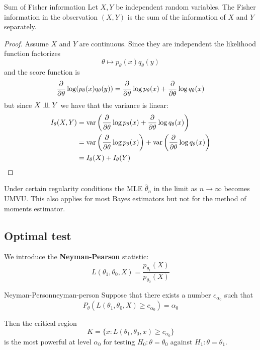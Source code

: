 \documentclass[12pt]{extarticle}
\renewcommand{\var}{{\operatorfont var}}
\begin{document}
\begin{lemma}{Sum of Fisher information}{}
    Let $X, Y$ be independent random variables.
    The Fisher information in the observation $(X, Y)$ is the sum of the information of $X$ and $Y$ separately.
\end{lemma}

\begin{proof}
    Assume $X$ and $Y$ are continuous.
    Since they are independent the likelihood function factorizes
    \begin{equation}
        \theta \mapsto p_\theta(x)q_\theta(y)
    \end{equation}
    and the score function is
    \begin{equation}
        \pdv{\theta} \log(p_\theta(x)q_\theta(y)) = \pdv{\theta} \log p_\theta(x) + \pdv{\theta} \log q_\theta(x)
    \end{equation}
    but since $X \perp \!\!\! \perp Y$ we have that the variance is linear:
    \begin{align}
        I_\theta(X, Y) & = \var \left(\pdv{\theta} \log p_\theta(x) + \pdv{\theta} \log q_\theta(x)\right)                   \\
                       & = \var \left(\pdv{\theta} \log p_\theta(x)\right) + \var \left(\pdv{\theta} \log q_\theta(x)\right) \\
                       & = I_\theta(X) + I_\theta(Y)
    \end{align}
\end{proof}

Under certain regularity conditions the MLE $\hat \theta_n$ in the limit as $n \to \infty$ becomes UMVU.
This also applies for most Bayes estimators but not for the method of moments estimator.

\subsection{Optimal test}

We introduce the \textbf{Neyman-Pearson} statistic:
\begin{equation}
    L(\theta_1, \theta_0, X) = \frac{p_{\theta_1}(X)}{p_{\theta_0}(X)}
\end{equation}

\begin{theorem}{Neyman-Person}{neyman-person}
    Suppose that there exists a number $c_{\alpha_0}$ such that
    \begin{equation}
        P_\theta(L(\theta_1, \theta_0, X)\geq c_{\alpha_0})= \alpha_0
    \end{equation}

    Then the critical region
    \begin{equation}
        K = \{ x : L(\theta_1, \theta_0, x) \geq c_{\alpha_0} \}
    \end{equation}
    is the most powerful at level $\alpha_0$ for testing $H_0: \theta = \theta_0$ against $H_1: \theta = \theta_1$.
\end{theorem}
\end{document}
